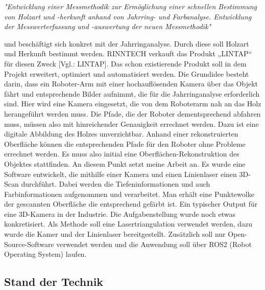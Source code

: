 	\textit{"Entwicklung einer Messmethodik zur Ermöglichung einer schnellen Bestimmung von Holzart und -herkunft anhand von Jahrring- und Farbanalyse. Entwicklung der Messwerterfassung und -auswertung der neuen Messmethodik"}
	
	und beschäftigt sich konkret mit der Jahrringanalyse. Durch diese soll Holzart und Herkunft bestimmt werden. RINNTECH verkauft das Produkt „LINTAP“ für diesen Zweck [Vgl.: LINTAP]. Das schon existierende Produkt soll in dem Projekt erweitert, optimiert und automatisiert werden. Die Grundidee besteht darin, dass ein Roboter-Arm mit einer hochauflösenden Kamera über das Objekt fährt und entsprechende Bilder aufnimmt, die für die Jahrringanalyse erforderlich sind. Hier wird eine Kamera eingesetzt, die von dem Roboterarm nah an das Holz herangeführt werden muss. Die Pfade, die der Roboter dementsprechend abfahren muss, müssen also mit hinreichender Genauigkeit errechnet werden. Dazu ist eine digitale Abbildung des Holzes unverzichtbar. Anhand einer rekonstruierten Oberfläche können die entsprechenden Pfade für den Roboter ohne Probleme errechnet werden. Es muss also initial eine Oberflächen-Rekonstruktion des Objektes stattfinden. An diesem Punkt setzt meine Arbeit an. Es wurde eine Software entwickelt, die mithilfe einer Kamera und einen Linienlaser einen 3D-Scan durchführt. Dabei werden die Tiefeninformationen und auch Farbinformationen aufgenommen und verarbeitet. Man erhält eine Punktewolke der gescannten Oberfläche die entsprechend gefärbt ist. Ein typischer Output für eine 3D-Kamera in der Industrie. Die  \linebreak Aufgabenstellung wurde noch etwas konkretisiert. Als Methode soll eine Lasertriangulation verwendet werden, dazu wurde die Kamer und der Linienlaser bereitgestellt. Zusätzlich soll nur Open-Source-Software verwendet werden und die Anwendung soll über ROS2 (Robot Operating System) laufen.
	
	\subsection{Stand der Technik}

